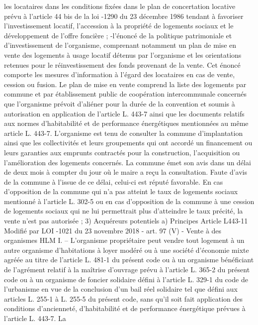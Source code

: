 \documentclass[11pt,a4paper]{report}
\begin{document}
	les locataires dans les conditions fixées dans le plan de concertation locative prévu à l'article 44 bis de la loi -1290 du 23 décembre 1986 tendant à favoriser l'investissement locatif, l'accession à la propriété de
	logements sociaux et le développement de l'offre foncière ;
	-l'énoncé de la politique patrimoniale et d'investissement de l'organisme, comprenant notamment un plan de
	mise en vente des logements à usage locatif détenus par l'organisme et les orientations retenues pour le
	réinvestissement des fonds provenant de la vente. Cet énoncé comporte les mesures d'information à l'égard des
	locataires en cas de vente, cession ou fusion. Le plan de mise en vente comprend la liste des logements par
	commune et par établissement public de coopération intercommunale concernés que l'organisme prévoit
	d'aliéner pour la durée de la convention et soumis à autorisation en application de l'article L. 443-7 ainsi que
	les documents relatifs aux normes d'habitabilité et de performance énergétiques mentionnées au même article L.
	443-7. L'organisme est tenu de consulter la commune d'implantation ainsi que les collectivités et leurs
	groupements qui ont accordé un financement ou leurs garanties aux emprunts contractés pour la construction,
	l'acquisition ou l'amélioration des logements concernés. La commune émet son avis dans un délai de deux mois
	à compter du jour où le maire a reçu la consultation. Faute d'avis de la commune à l'issue de ce délai, celui-ci
	est réputé favorable. En cas d'opposition de la commune qui n'a pas atteint le taux de logements sociaux
	mentionné à l'article L. 302-5 ou en cas d'opposition de la commune à une cession de logements sociaux qui ne
	lui permettrait plus d'atteindre le taux précité, la vente n'est pas autorisée ;
	3) Acquéreurs potentiels
	a) Principes
	Article L443-11 Modifié par LOI -1021 du 23 novembre 2018 - art. 97 (V)
	-
	Vente à des organismes HLM
	I. – L'organisme propriétaire peut vendre tout logement à un autre organisme d'habitations à loyer modéré ou à
	une société d'économie mixte agréée au titre de l'article L. 481-1 du présent code ou à un organisme bénéficiant
	de l'agrément relatif à la maîtrise d'ouvrage prévu à l'article L. 365-2 du présent code ou à un organisme de
	foncier solidaire défini à l'article L. 329-1 du code de l'urbanisme en vue de la conclusion d'un bail réel
	solidaire tel que défini aux articles L. 255-1 à L. 255-5 du présent code, sans qu'il soit fait application des
	conditions d'ancienneté, d'habitabilité et de performance énergétique prévues à l'article L. 443-7. La
\end{document}
